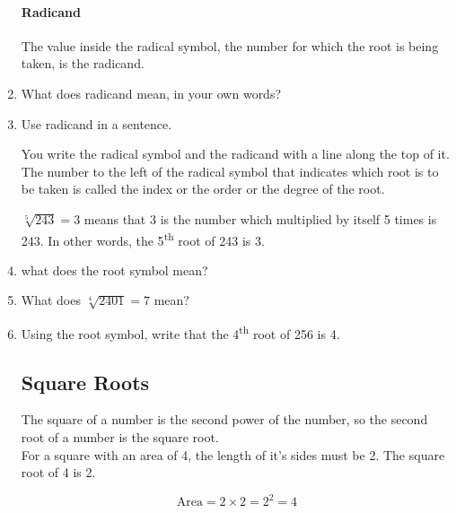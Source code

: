 \documentclass[12pt]{article}
\begin{document}
\begin{enumerate}
\paragraph{Radicand}
The value inside the radical symbol, the number for which the root is being taken, is the radicand.

\item What does radicand mean, in your own words?
\item Use radicand in a sentence.

You write the radical \raisebox{.8ex}{$\sqrt{}$} symbol and the radicand with a line along the top of it. The number to the left of the radical symbol that indicates which root is to be taken is called the index or the order or the degree of the root.\\

\begin{center}
 {\fontsize{40}{44}}
\end{center}

$\sqrt[5]{243} = 3$ means that 3 is the number which multiplied by itself 5 times is 243. In other words, the 5\textsuperscript{th} root of 243 is 3.

\item what does the \raisebox{.8ex}{$\sqrt{}$} root symbol mean?
\item What does $\sqrt[4]{2401}=7$ mean?
\item Using the root symbol, write that the 4\textsuperscript{th} root of 256 is 4.

\subsection*{Square Roots}

The square of a number is the second power of the number, so the second root of a number is the square root.\\

For a square with an area of 4, the length of it’s sides must be 2. The square root of 4 is 2.

\begin{figure}
  \centering
  \quad
  \begin{minipage}{5cm}
    \[
    \text{Area} = 2 \times 2 = 2^2 = 4
    \]
  \end{minipage}
\end{figure}


\end{enumerate}
\end{document}
